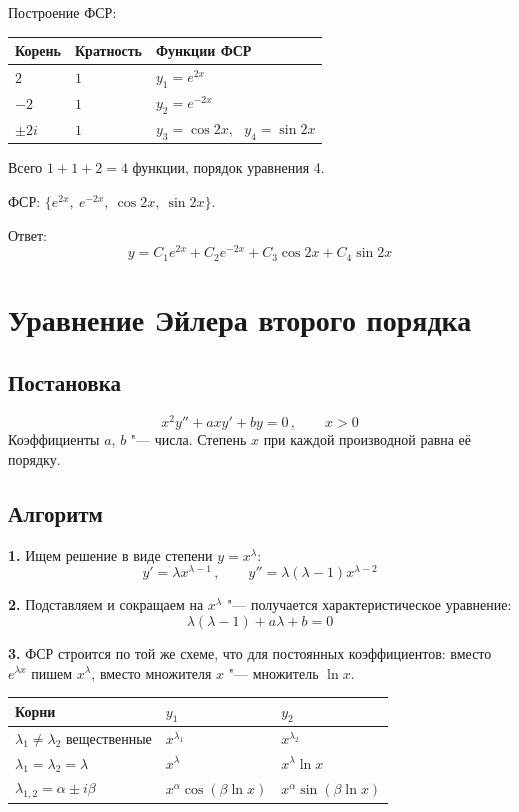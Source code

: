 \documentclass[11pt,a4paper]{article}
\makeatletter
\newenvironment{fsrtable}{\begin{center}\begin{tabular}{@{}lll@{}}\toprule
Корень & Кратность & Функции ФСР\\\midrule}{\\\bottomrule\end{tabular}\end{center}}
\makeatother
\begin{document}
Построение ФСР:
\begin{fsrtable}
$2$ & $1$ & $y_1 = e^{2x}$\\
$-2$ & $1$ & $y_2 = e^{-2x}$\\
$\pm 2i$ & $1$ & $y_3 = \cos 2x$, \ $y_4 = \sin 2x$
\end{fsrtable}

Всего $1 + 1 + 2 = 4$ функции, порядок уравнения 4.

ФСР: $\{e^{2x},\ e^{-2x},\ \cos 2x,\ \sin 2x\}$.

Ответ:
\[
  y = C_1 e^{2x} + C_2 e^{-2x} + C_3\cos 2x + C_4\sin 2x
\]

\section*{Уравнение Эйлера второго порядка}

\subsection*{Постановка}

\[
  x^2 y'' + a x y' + b y = 0\,, \qquad x > 0
\]
Коэффициенты $a$, $b$ "--- числа. Степень $x$ при каждой производной равна её порядку.

\subsection*{Алгоритм}

\textbf{1.} Ищем решение в виде степени $y = x^{\lambda}$:
\[
  y' = \lambda x^{\lambda-1}\,, \qquad y'' = \lambda(\lambda-1)x^{\lambda-2}
\]

\textbf{2.} Подставляем и сокращаем на $x^{\lambda}$ "--- получается характеристическое уравнение:
\[
  \lambda(\lambda-1) + a\lambda + b = 0
\]

\textbf{3.} ФСР строится по той же схеме, что для постоянных коэффициентов: вместо $e^{\lambda x}$ пишем $x^{\lambda}$, вместо множителя $x$ "--- множитель $\ln x$.
\begin{center}
\begin{tabular}{@{}lll@{}}
\toprule
Корни & $y_1$ & $y_2$\\
\midrule
$\lambda_1 \ne \lambda_2$ вещественные & $x^{\lambda_1}$ & $x^{\lambda_2}$\\
$\lambda_1 = \lambda_2 = \lambda$ & $x^{\lambda}$ & $x^{\lambda}\ln x$\\
$\lambda_{1,2} = \alpha \pm i\beta$ & $x^{\alpha}\cos(\beta\ln x)$ & $x^{\alpha}\sin(\beta\ln x)$\\
\bottomrule
\end{tabular}
\end{center}
\end{document}
